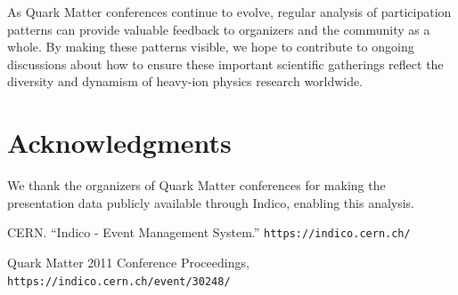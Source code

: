 \documentclass[a4paper,11pt]{article}
\begin{document}
As Quark Matter conferences continue to evolve, regular analysis of participation patterns can provide valuable feedback to organizers and the community as a whole. By making these patterns visible, we hope to contribute to ongoing discussions about how to ensure these important scientific gatherings reflect the diversity and dynamism of heavy-ion physics research worldwide.

\section{Acknowledgments}

We thank the organizers of Quark Matter conferences for making the presentation data publicly available through Indico, enabling this analysis.


\begin{thebibliography}{9}
CERN. ``Indico - Event Management System.'' 
\texttt{https://indico.cern.ch/}

Quark Matter 2011 Conference Proceedings,
\texttt{https://indico.cern.ch/event/30248/}

\end{thebibliography}
\end{document}

